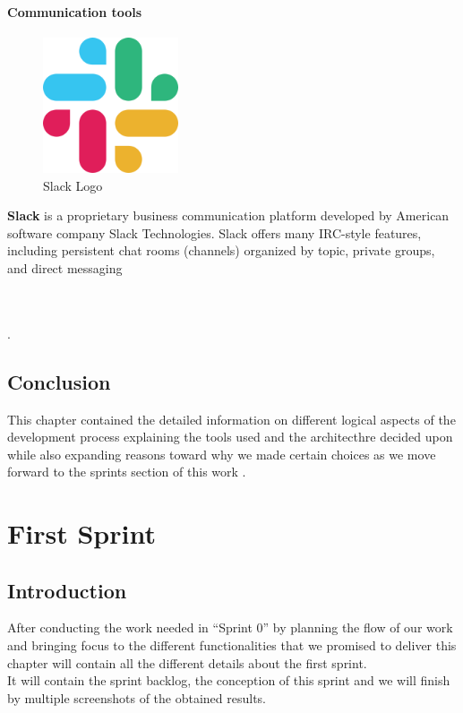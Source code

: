 \documentclass[]{report}
\begin{document}
\subsubsection{Communication tools}


\begin{figure}
	\includegraphics[width=4cm]{slackLogo}
	\caption{Slack Logo}
\end{figure} 



\textbf{Slack} is a proprietary business communication platform developed by American software company Slack Technologies. Slack offers many IRC-style features, including persistent chat rooms (channels) organized by topic, private groups, and direct messaging
\\\\\\\par.
\section{Conclusion}

This chapter contained the detailed information on different logical aspects of the development process explaining the tools used and the architecthre decided upon while also expanding reasons toward why we made certain choices as we move forward to the sprints section of this work .

\chapter{First Sprint}
\section{Introduction}
After conducting the work needed in “Sprint 0” by planning the flow of our work and bringing focus to the different functionalities that we promised to deliver this chapter will contain all the different details about the first sprint. \\
It will contain the sprint backlog, the conception of this sprint and we will finish by multiple screenshots of the obtained results.
\end{document}
